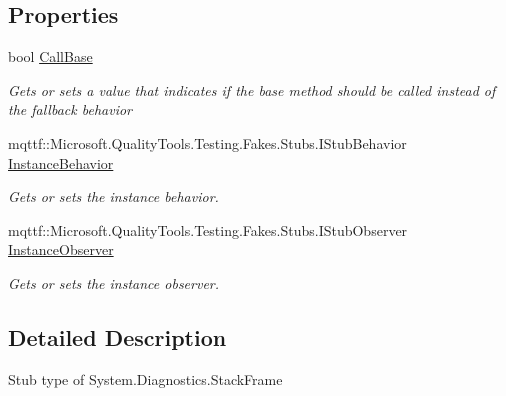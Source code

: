 \subsection*{Properties}
\begin{DoxyCompactItemize}
\item 
bool \hyperlink{class_system_1_1_diagnostics_1_1_fakes_1_1_stub_stack_frame_ae187de3484d602faf9fbe87d837abf7e}{Call\-Base}
\begin{DoxyCompactList}\small\item\em Gets or sets a value that indicates if the base method should be called instead of the fallback behavior\end{DoxyCompactList}\item 
mqttf\-::\-Microsoft.\-Quality\-Tools.\-Testing.\-Fakes.\-Stubs.\-I\-Stub\-Behavior \hyperlink{class_system_1_1_diagnostics_1_1_fakes_1_1_stub_stack_frame_abf5b73af395cd223312bdd68fd33225f}{Instance\-Behavior}
\begin{DoxyCompactList}\small\item\em Gets or sets the instance behavior.\end{DoxyCompactList}\item 
mqttf\-::\-Microsoft.\-Quality\-Tools.\-Testing.\-Fakes.\-Stubs.\-I\-Stub\-Observer \hyperlink{class_system_1_1_diagnostics_1_1_fakes_1_1_stub_stack_frame_add0dc99adc801186d332eb14ae463359}{Instance\-Observer}
\begin{DoxyCompactList}\small\item\em Gets or sets the instance observer.\end{DoxyCompactList}\end{DoxyCompactItemize}


\subsection{Detailed Description}
Stub type of System.\-Diagnostics.\-Stack\-Frame



